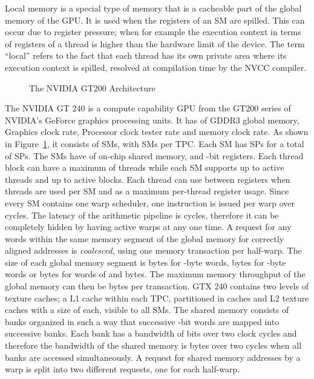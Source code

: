 \documentclass{ws-ijait}
\begin{document}
Local memory is a special type of memory that is a cacheable part of the global memory of the GPU. It is used when the registers of an SM are spilled. This can occur due to register pressure; when for example the execution context in terms of registers of a thread is higher than the hardware limit of the device. The term ``local'' refers to the fact that each thread has its own private area where its execution context is spilled, resolved at compilation time by the NVCC compiler.

\begin{figure}[h]
\centering
{}
  \caption{The NVIDIA GT200 Architecture}
  \label{fig:GT240}
\end{figure}

The NVIDIA GT 240 is a compute capability  GPU from the GT200 series of NVIDIA's GeForce graphics processing units. It has  of GDDR3 global memory,  Graphics clock rate,  Processor clock tester rate and  memory clock rate. As shown in Figure~\ref{fig:GT240}, it consists of  SMs, with  SMs per TPC. Each SM has  SPs for a total of  SPs. The SMs have  of on-chip shared memory, and  -bit registers. Each thread block can have a maximum of  threads while each SM supports up to  active threads and up to  active blocks. Each thread can use between  registers when  threads are used per SM and  as a maximum per-thread register usage. Since every SM contains one warp scheduler, one instruction is issued per warp over  cycles. The latency of the arithmetic pipeline is  cycles, therefore it can be completely hidden by having  active warps at any one time. A request for any words within the same memory segment of the global memory for correctly aligned addresses is \textit{coalesced}, using one memory transaction per half-warp. The size of each global memory segment is  bytes for -byte words,  bytes for -byte words or  bytes for words of  and  bytes. The maximum memory throughput of the global memory can then be  bytes per transaction. GTX 240 contains two levels of texture caches; a  L1 cache within each TPC, partitioned in  caches and  L2 texture caches with a size of  each, visible to all SMs. The shared memory consists of  banks organized in such a way that successive -bit words are mapped into successive banks.\cite{CUDA_SDK} Each bank has a bandwidth of  bits over two clock cycles and therefore the bandwidth of the shared memory is  bytes over two cycles when all banks are accessed simultaneously. A request for shared memory addresses by a warp is split into two different requests, one for each half-warp.
\end{document}
